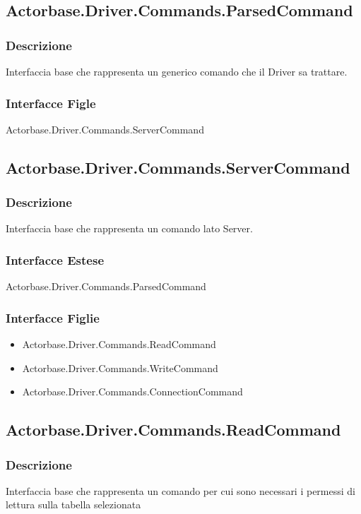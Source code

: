 \documentclass[a4paper]{article}
\begin{document}
		\subsection{Actorbase.Driver.Commands.ParsedCommand}
			\subsubsection{Descrizione} Interfaccia base che rappresenta un generico comando che il Driver sa trattare.
			\subsubsection{Interfacce Figle} Actorbase.Driver.Commands.ServerCommand

		
		\subsection{Actorbase.Driver.Commands.ServerCommand}
			\subsubsection{Descrizione} Interfaccia base che rappresenta un comando lato Server.
			\subsubsection{Interfacce Estese} Actorbase.Driver.Commands.ParsedCommand
			\subsubsection{Interfacce Figlie}
				\begin{itemize}
					\item Actorbase.Driver.Commands.ReadCommand
					\item Actorbase.Driver.Commands.WriteCommand
					\item Actorbase.Driver.Commands.ConnectionCommand
				\end{itemize}
		
		\subsection{Actorbase.Driver.Commands.ReadCommand}
				\subsubsection{Descrizione} Interfaccia base che rappresenta un comando per cui sono necessari i permessi di lettura sulla tabella selezionata
\end{document}
